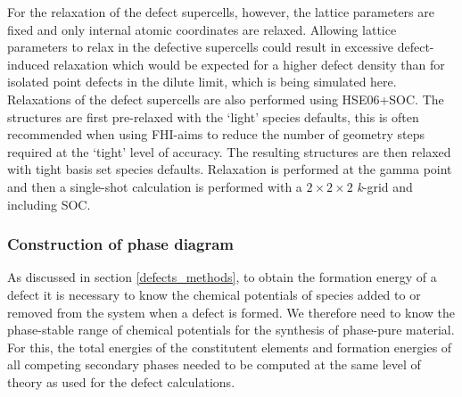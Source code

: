 \documentclass[11pt, twoside]{report}
\begin{document}
For the relaxation of the defect supercells, however, the lattice parameters are fixed and only internal atomic coordinates are relaxed. Allowing lattice parameters to relax in the defective supercells could result in excessive defect-induced relaxation which would be expected for a higher defect density than for isolated point defects in the dilute limit, which is being simulated here. Relaxations of the defect supercells are also performed using HSE06+SOC. The structures are first pre-relaxed with the `light' species defaults, this is often recommended when using FHI-aims to reduce the number of geometry steps required at the `tight' level of accuracy. The resulting structures are then relaxed with tight basis set species defaults. Relaxation is performed at the gamma point and then a single-shot calculation is performed with a $2\times2\times2$ \textit{k}-grid and including SOC.





\subsubsection{Construction of phase diagram}
As discussed in section \ref{defects_methods}, to obtain the formation energy of a defect it is necessary to know the chemical potentials of species added to or removed from the system when a defect is formed. We therefore need to know the phase-stable range of chemical potentials for the synthesis of phase-pure material. For this, the total energies of the constitutent elements and formation energies of all competing secondary phases needed to be computed at the same level of theory as used for the defect calculations.
\end{document}
